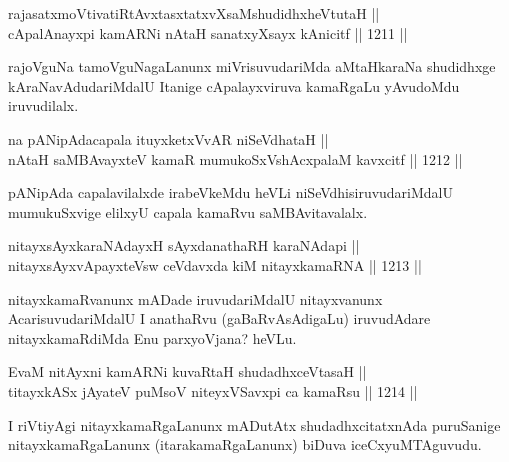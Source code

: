 \begin{shl}
rajasatxmoVtivatiRtAvxtasxtatxvXsaMshudidhxheVtutaH || \\
cApalAnayxpi kamARNi nAtaH sanatxyXsayx kAnicitf \hfill || 1211 ||  
\end{shl}

\begin{artha}
rajoVguNa tamoVguNagaLanunx miVrisuvudariMda aMtaHkaraNa shudidhxge kAraNavAdudariMdalU Itanige cApalayxviruva kamaRgaLu yAvudoMdu iruvudilalx.
\end{artha}

\begin{shl}
\footnotemark[1]na pANipAdacapala ituyxketxVvAR niSeVdhataH || \\
nAtaH saMBAvayxteV kamaR mumukoSxVshAcxpalaM kavxcitf \hfill || 1212 ||  
\end{shl}

\begin{artha}
pANipAda capalavilalxde irabeVkeMdu heVLi niSeVdhisiruvudariMdalU mumukuSxvige elilxyU capala kamaRvu saMBAvitavalalx.
\end{artha}

\begin{shl}
nitayxsAyxkaraNAdayxH sAyxdanathaRH karaNAdapi || \\
nitayxsAyxvApayxteV\s sw ceVdavxda kiM nitayxkamaRNA \hfill || 1213 ||  
\end{shl}

\begin{artha}
nitayxkamaRvanunx mADade iruvudariMdalU nitayxvanunx AcarisuvudariMdalU I anathaRvu (gaBaRvAsAdigaLu) iruvudAdare nitayxkamaRdiMda Enu parxyoVjana? heVLu.
\end{artha}

\begin{shl}
EvaM nitAyxni kamARNi kuvaRtaH shudadhxceVtasaH || \\
titayxkASx jAyateV puMsoV niteyxVSavxpi ca kamaRsu \hfill || 1214 ||  
\end{shl}

\begin{artha}
I riVtiyAgi nitayxkamaRgaLanunx mADutAtx shudadhxcitatxnAda puruSanige nitayxkamaRgaLanunx (itarakamaRgaLanunx) biDuva iceCxyuMTAguvudu.
\end{artha}

